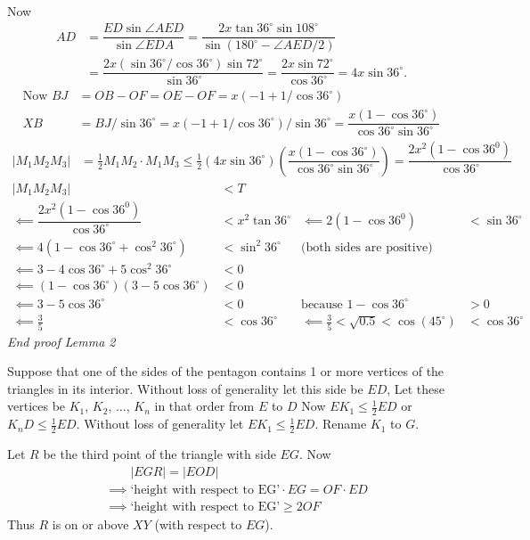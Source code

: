 \documentclass[12pt]{article}
\begin{document}
\begin{enumerate}[topsep=\bigskipamount,itemsep=\bigskipamount,leftmargin=0pt]
Now
\begin{align*}
    AD &= \dfrac{ED \sin \angle AED}{\sin \angle EDA}
    = \dfrac{2x \tan 36^\circ \sin 108^\circ}{\sin (180^\circ-\angle AED/2)} \\
    &= \dfrac{2x (\sin 36^\circ/\cos 36^\circ) \sin 72^\circ}{\sin 36^\circ}
    = \dfrac{2x \sin 72^\circ}{\cos 36^\circ}
    = 4x \sin 36^\circ.
\end{align*}
\begin{align*}
    \text{Now } BJ &= OB - OF = OE - OF = x(-1+1/\cos 36^\circ) \\
    XB &= BJ/\sin 36^\circ = x(-1+1/\cos 36^\circ)/\sin 36^\circ = \dfrac{x(1-\cos 36^\circ)}{\cos 36^\circ \sin 36^\circ}
\end{align*}
\begin{align*}
    |M_1 M_2 M_3| &= \frac{1}{2} M_1 M_2 \cdot M_1 M_3
    \leq \frac{1}{2} (4x \sin 36^\circ) \left(\dfrac{x(1-\cos 36^\circ)}{\cos 36^\circ \sin 36^\circ}\right) = \dfrac{2x^2 (1-\cos 36^0)}{\cos 36^\circ}
\end{align*}
\begin{align*}
    |M_1 M_2 M_3| &< T \\
    \impliedby \dfrac{2x^2 (1-\cos 36^0)}{\cos 36^\circ} &< x^2 \tan 36^\circ
    & \impliedby 2 (1-\cos 36^0) &< \sin 36^\circ \\
    \impliedby 4(1-\cos 36^\circ + \cos^2 36^\circ) &< \sin^2 36^\circ &\text{(both sides are positive)} \\
    \impliedby 3-4\cos 36^\circ + 5\cos^2 36^\circ &< 0 \\
    \impliedby (1-\cos 36^\circ)(3-5\cos 36^\circ) &< 0 \\
    \impliedby 3-5\cos 36^\circ &< 0 &\text{because } 1-\cos 36^\circ &> 0 \\
    \impliedby \frac{3}{5} &< \cos 36^\circ
    & \impliedby \frac{3}{5} < \sqrt{0.5} < \cos(45^\circ) &< \cos 36^\circ
\end{align*}
\textit{End proof Lemma 2}

Suppose that one of the sides of the pentagon contains 1 or more vertices of the triangles in its interior.
Without loss of generality let this side be $ED$,
Let these vertices be $K_1$, $K_2$, $\dots$, $K_n$ in that order from $E$ to $D$
Now $EK_1 \leq \frac{1}{2}ED$ or $K_n D\leq \frac{1}{2} ED$.
Without loss of generality let $EK_1 \leq \frac{1}{2}ED$.
Rename $K_1$ to $G$.

Let $R$ be the third point of the triangle with side $EG$.
Now
\begin{align*}
    &\mathrel{\phantom{\implies}} |EGR| = |EOD| \\
    &\implies \text{`height with respect to EG'}\cdot EG = OF\cdot ED \\
    &\implies \text{`height with respect to EG'}\geq 2 OF
\end{align*}
Thus $R$ is on or above $XY$ (with respect to $EG$).


\end{enumerate}
\end{document}
